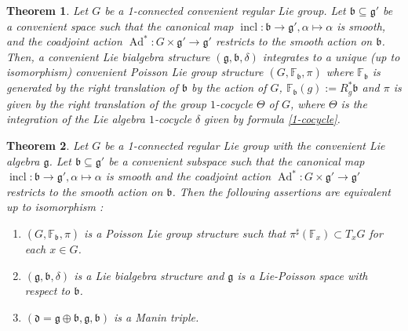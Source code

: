 \documentclass[11pt,reqno]{amsart}
\newtheorem{theorem}{Theorem}[section]
\theoremstyle{definition}
\numberwithin{equation}{section}
\begin{document}
\begin{theorem}\label{D-2}
Let $G$ be a 1-connected convenient regular Lie group. Let $\mathfrak b\subseteq \mathfrak g'$ be a convenient space such that the canonical map $\operatorname{incl}:\mathfrak b\to \mathfrak g', \alpha \mapsto \alpha$ is smooth, and the coadjoint action $\operatorname{Ad}^*: G\times \mathfrak g'\to \mathfrak g'$ restricts to the smooth action on $\mathfrak b$. Then, a convenient Lie bialgebra structure $(\mathfrak{g}, \mathfrak{b}, \delta)$ integrates to a unique (up to isomorphism) convenient Poisson Lie group structure $(G, \mathbb{F}_{\mathfrak{b}}, \pi)$ where $\mathbb F_{\mathfrak b}$ is generated by the right translation of $\mathfrak b$ by the action of $G$,  $\mathbb F_{\mathfrak b}(g):=R_{g}^*\mathfrak b$ and $\pi$ is given by the right translation of the group $1$-cocycle $\Theta$ of $G$, where $\Theta$ is the integration of the Lie algebra $1$-cocycle $\delta$ given by formula \ref{1-cocycle}. 
\end{theorem}

\begin{theorem}\label{D-3}
Let $G$ be a 1-connected regular Lie group with the convenient Lie algebra $\mathfrak g$. Let $\mathfrak b\subseteq \mathfrak g'$ be a convenient subspace such that the canonical map $\operatorname{incl}:\mathfrak b\to \mathfrak g', \alpha\mapsto \alpha$ is smooth and the coadjoint action $\operatorname{Ad}^*: G\times \mathfrak g'\to \mathfrak g'$ restricts to the smooth action on $\mathfrak b$.
Then the following assertions are equivalent up to isomorphism :
\begin{enumerate}
    \item $(G, \mathbb{F}_{\mathfrak{b}}, \pi)$ is a Poisson Lie group structure such that $\pi^{\sharp}(\mathbb{F}_x) \subset T_xG$ for each $x \in G$.
    \item $(\mathfrak{g}, \mathfrak{b}, \delta)$ is a Lie bialgebra structure and $\mathfrak{g}$ is a Lie-Poisson space with respect to $\mathfrak{b}$.
    \item $(\mathfrak{d} = \mathfrak{g} \oplus \mathfrak{b}, \mathfrak{g}, \mathfrak{b})$ is a Manin triple.
\end{enumerate}
\end{theorem}
\end{document}
